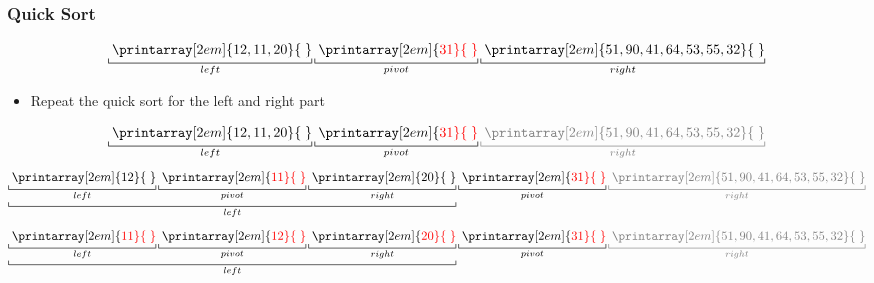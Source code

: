 \documentclass[newPxFont,sthlmFooter,nooffset]{beamer}
\begin{document}
\begin{frame}[t, fragile]
  \frametitle{Quick Sort}
\[
\underbracket[0.5pt]{{\thickspace}\printarray[2em]{12, 11, 20}{\thickspace}}_{left}
\underbracket[0.5pt]{{\thickspace}\printarray[2em]{\color{red}31}{\thickspace}}_{pivot}
\underbracket[0.5pt]{{\thickspace}\printarray[2em]{51, 90, 41, 64, 53, 55, 32}{\thickspace}}_{right}
\] 

\begin{itemize}
\item Repeat the quick sort for the left and right part
\end{itemize}

\[
\underbracket[0.5pt]{{\thickspace}\printarray[2em]{12, 11, 20}{\thickspace}}_{left}
\underbracket[0.5pt]{{\thickspace}\printarray[2em]{\color{red}31}{\thickspace}}_{pivot}
\color{black!50}\underbracket[0.5pt]{{\thickspace}\printarray[2em]{51, 90, 41, 64, 53, 55, 32}{\thickspace}}_{right}
\] \pause
\[
\underbracket[0.5pt]{
\underbracket[0.5pt]{{\thickspace}\printarray[2em]{12}{\thickspace}}_{left} 
\underbracket[0.5pt]{{\thickspace}\printarray[2em]{\color{red}11}{\thickspace}}_{pivot}
\underbracket[0.5pt]{{\thickspace}\printarray[2em]{ 20}{\thickspace}}_{right}
}_{left}
\underbracket[0.5pt]{{\thickspace}\printarray[2em]{\color{red}31}{\thickspace}}_{pivot}
\color{black!50}\underbracket[0.5pt]{{\thickspace}\printarray[2em]{51, 90, 41, 64, 53, 55, 32}{\thickspace}}_{right}
\] \pause
\[
\underbracket[0.5pt]{
\underbracket[0.5pt]{{\thickspace}\printarray[2em]{\color{red}11}{\thickspace}}_{left} 
\underbracket[0.5pt]{{\thickspace}\printarray[2em]{\color{red}12}{\thickspace}}_{pivot}
\underbracket[0.5pt]{{\thickspace}\printarray[2em]{\color{red}20}{\thickspace}}_{right}
}_{left}
\underbracket[0.5pt]{{\thickspace}\printarray[2em]{\color{red}31}{\thickspace}}_{pivot}
\color{black!50}\underbracket[0.5pt]{{\thickspace}\printarray[2em]{51, 90, 41, 64, 53, 55, 32}{\thickspace}}_{right}
\] 



\end{frame}
\end{document}
